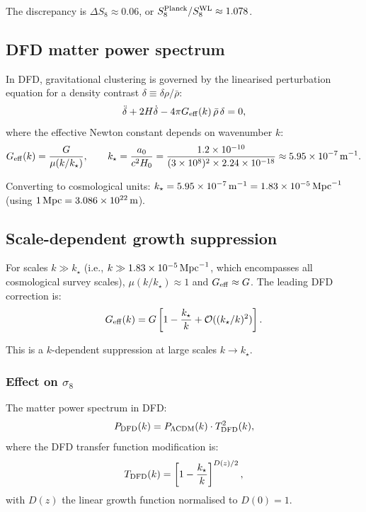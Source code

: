 \documentclass[11pt]{article}
\newcommand{\ee}[1]{\times 10^{#1}}
\newcommand{\mufd}{\mu}
\newcommand{\order}[1]{\mathcal{O}(#1)}
\newcommand{\DFD}{{\rm DFD}}
\newcommand{\LCDM}{\Lambda{\rm CDM}}
\begin{document}
\noindent The discrepancy is $\Delta S_8 \approx 0.06$, or $S_8^{\rm Planck}/S_8^{\rm WL}
\approx 1.078$.

\subsection{DFD matter power spectrum}

In DFD, gravitational clustering is governed by the linearised
perturbation equation for a density contrast $\delta \equiv \delta\rho/\bar\rho$:
\begin{equation}\label{eq:dfD-growth}
  \ddot\delta + 2H\dot\delta - 4\pi G_{\rm eff}(k)\,\bar\rho\,\delta = 0,
\end{equation}
where the effective Newton constant depends on wavenumber $k$:
\begin{equation}\label{eq:Geff}
  G_{\rm eff}(k) = \frac{G}{\mufd(k/k_\star)},
  \qquad k_\star = \frac{a_0}{c^2 H_0} = \frac{1.2\ee{-10}}{(3\ee{8})^2
  \times 2.24\ee{-18}} \approx 5.95\ee{-7}\,{\rm m}^{-1}.
\end{equation}

Converting to cosmological units: $k_\star = 5.95\ee{-7}\,{\rm m}^{-1}
= 1.83\ee{-5}\,{\rm Mpc}^{-1}$ (using $1\,{\rm Mpc} = 3.086\ee{22}\,{\rm m}$).

\subsection{Scale-dependent growth suppression}

For scales $k \gg k_\star$ (i.e., $k \gg 1.83\ee{-5}\,{\rm Mpc}^{-1}$,
which encompasses all cosmological survey scales), $\mufd(k/k_\star) \approx 1$
and $G_{\rm eff} \approx G$.  The leading DFD correction is:
\begin{equation}
  G_{\rm eff}(k) = G\left[1 - \frac{k_\star}{k} + \order{(k_\star/k)^2}\right].
\end{equation}

This is a $k$-dependent suppression at large scales $k \to k_\star$.

\subsubsection{Effect on $\sigma_8$}

The matter power spectrum in DFD:
\begin{equation}
  P_\DFD(k) = P_{\LCDM}(k)\cdot T^2_\DFD(k),
\end{equation}
where the DFD transfer function modification is:
\begin{equation}\label{eq:T-DFD}
  T_\DFD(k) = \left[1 - \frac{k_\star}{k}\right]^{D(z)/2},
\end{equation}
with $D(z)$ the linear growth function normalised to $D(0) = 1$.
\end{document}
